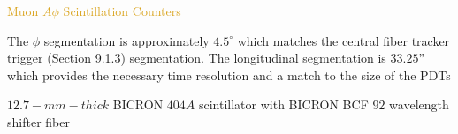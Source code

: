 \begin{frame}{\textcolor{Goldenrod}{Muon $A\phi$ Scintillation Counters}}
\begin{overlayarea}{\textwidth}{\textheight}
  \item
    The $\phi$ segmentation is approximately $4.5^{\circ}$ which matches the
    central fiber tracker trigger (Section 9.1.3) segmentation. The
    longitudinal segmentation is $33.25”$ which provides the necessary
    time resolution and a match to the size of the PDTs

  \item
    $12.7-mm-thick$ BICRON $404A$ scintillator with BICRON BCF $92$
    wavelength shifter fiber
    
    
    
    \tti
  \end{overlayarea}
\end{frame}


